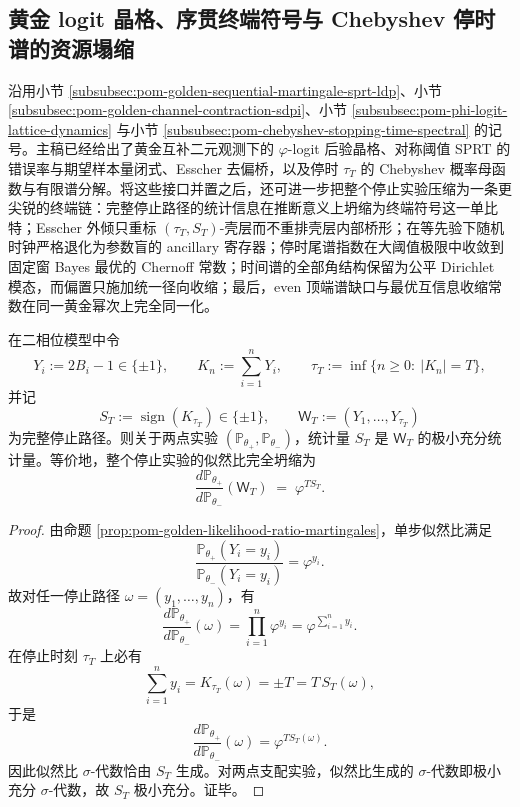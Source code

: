 \subsection{黄金 logit 晶格、序贯终端符号与 Chebyshev 停时谱的资源塌缩}\label{subsec:conclusion-golden-logit-sprt-esscher-chebyshev-resource-collapse}
沿用小节 \ref{subsubsec:pom-golden-sequential-martingale-sprt-ldp}、小节 \ref{subsubsec:pom-golden-channel-contraction-sdpi}、小节 \ref{subsubsec:pom-phi-logit-lattice-dynamics} 与小节 \ref{subsubsec:pom-chebyshev-stopping-time-spectral} 的记号。主稿已经给出了黄金互补二元观测下的 \(\varphi\)-logit 后验晶格、对称阈值 SPRT 的错误率与期望样本量闭式、Esscher 去偏桥，以及停时 \(\tau_T\) 的 Chebyshev 概率母函数与有限谱分解。将这些接口并置之后，还可进一步把整个停止实验压缩为一条更尖锐的终端链：完整停止路径的统计信息在推断意义上坍缩为终端符号这一单比特；Esscher 外倾只重标 \((\tau_T,S_T)\)-壳层而不重排壳层内部桥形；在等先验下随机时钟严格退化为参数盲的 ancillary 寄存器；停时尾谱指数在大阈值极限中收敛到固定窗 Bayes 最优的 Chernoff 常数；时间谱的全部角结构保留为公平 Dirichlet 模态，而偏置只施加统一径向收缩；最后，even 顶端谱缺口与最优互信息收缩常数在同一黄金幂次上完全同一化。

\begin{theorem}[停止实验的终端符号极小充分性]\label{thm:conclusion-golden-sprt-terminal-sign-minimal-sufficiency}
在二相位模型中令
\[
Y_i:=2B_i-1\in\{\pm 1\},
\qquad
K_n:=\sum_{i=1}^{n}Y_i,
\qquad
\tau_T:=\inf\{n\ge 0:\ |K_n|=T\},
\]
并记
\[
S_T:=\operatorname{sign}(K_{\tau_T})\in\{\pm 1\},
\qquad
\mathsf W_T:=(Y_1,\dots,Y_{\tau_T})
\]
为完整停止路径。则关于两点实验 \((\mathbb P_{\theta_+},\mathbb P_{\theta_-})\)，统计量 \(S_T\) 是 \(\mathsf W_T\) 的极小充分统计量。等价地，整个停止实验的似然比完全坍缩为
\[
\boxed{\;
\frac{d\mathbb P_{\theta_+}}{d\mathbb P_{\theta_-}}(\mathsf W_T)
\;=\;
\varphi^{T S_T}.
\;}
\]
\end{theorem}
\begin{proof}
由命题 \ref{prop:pom-golden-likelihood-ratio-martingales}，单步似然比满足
\[
\frac{\mathbb P_{\theta_+}(Y_i=y_i)}{\mathbb P_{\theta_-}(Y_i=y_i)}=\varphi^{y_i}.
\]
故对任一停止路径 \(\omega=(y_1,\dots,y_n)\)，有
\[
\frac{d\mathbb P_{\theta_+}}{d\mathbb P_{\theta_-}}(\omega)
=
\prod_{i=1}^{n}\varphi^{y_i}
=
\varphi^{\sum_{i=1}^{n}y_i}.
\]
在停止时刻 \(\tau_T\) 上必有
\[
\sum_{i=1}^{n}y_i=K_{\tau_T}(\omega)=\pm T=T\,S_T(\omega),
\]
于是
\[
\frac{d\mathbb P_{\theta_+}}{d\mathbb P_{\theta_-}}(\omega)=\varphi^{T S_T(\omega)}.
\]
因此似然比 \(\sigma\)-代数恰由 \(S_T\) 生成。对两点支配实验，似然比生成的 \(\sigma\)-代数即极小充分 \(\sigma\)-代数，故 \(S_T\) 极小充分。证毕。
\end{proof}

